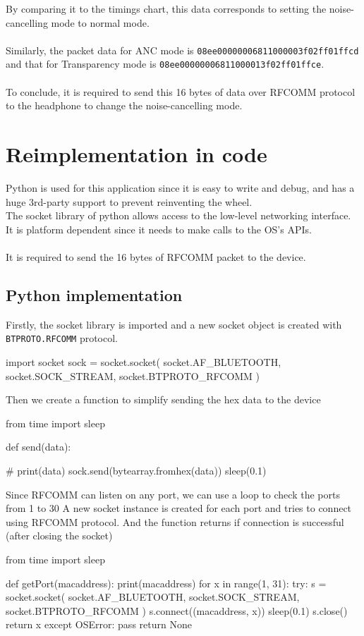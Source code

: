 \documentclass{article}
\theoremstyle{mytheoremstyle}
\theoremstyle{mytheoremstyle}
\theoremstyle{myproblemstyle}
\begin{document}
By comparing it to the timings chart, this data corresponds to setting the noise-cancelling mode to normal mode.
\\\\
Similarly, the packet data for ANC mode is \texttt{08ee00000006811000003f02ff01ffcd} and that for Transparency mode is \texttt{08ee00000006811000013f02ff01ffce}.
\\\\
To conclude, it is required to send this 16 bytes of data over RFCOMM protocol to the headphone to change the noise-cancelling mode.

\section{Reimplementation in code}

Python is used for this application since it is easy to write and debug,
and has a huge 3rd-party support to prevent reinventing the wheel.
\\
The socket\cite{py-socket} library of python allows access to the low-level networking interface.
It is platform dependent since it needs to make calls to the OS's APIs.
\\\\
It is required to send the 16 bytes of RFCOMM packet to the device.

\subsection{Python implementation}

Firstly, the socket library is imported and a new socket object is created with \texttt{BTPROTO.RFCOMM} protocol.

\begin{python}
import socket
sock = socket.socket(
    socket.AF_BLUETOOTH, socket.SOCK_STREAM, socket.BTPROTO_RFCOMM
)
\end{python}

Then we create a function to simplify sending the hex data to the device

\begin{python}
from time import sleep

def send(data):

    # print(data)
    sock.send(bytearray.fromhex(data))
    sleep(0.1)
\end{python}

Since RFCOMM can listen on any port, we can use a  loop to check the ports from 1 to 30\cite{rfcomm-port}
A new socket instance is created for each port and tries to connect using RFCOMM protocol. And the function returns if connection is successful (after closing the socket)
\begin{python}
from time import sleep

def getPort(macaddress):
    print(macaddress)
    for x in range(1, 31):
        try:
            s = socket.socket(
                socket.AF_BLUETOOTH, socket.SOCK_STREAM, socket.BTPROTO_RFCOMM
            )
            s.connect((macaddress, x))
            sleep(0.1)
            s.close()
            return x
        except OSError:
            pass
  return None
\end{python}
\end{document}
